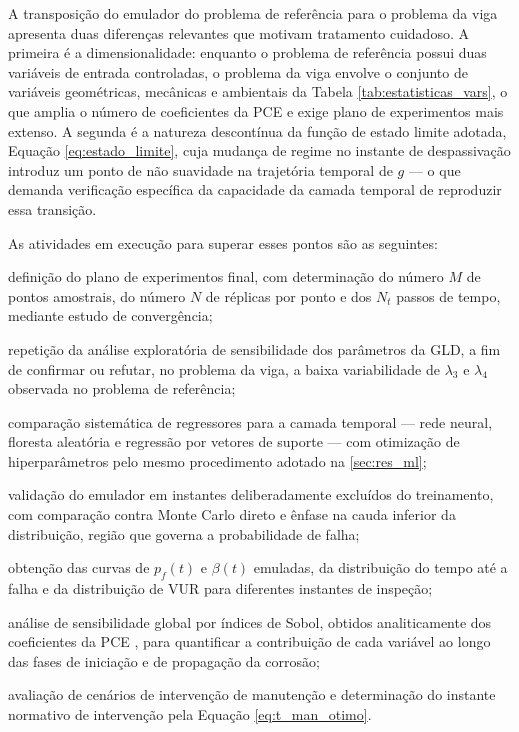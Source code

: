 A transposição do emulador do problema de referência para o problema da viga apresenta duas diferenças relevantes que motivam tratamento cuidadoso. A primeira é a dimensionalidade: enquanto o problema de referência possui duas variáveis de entrada controladas, o problema da viga envolve o conjunto de variáveis geométricas, mecânicas e ambientais da Tabela \ref{tab:estatisticas_vars}, o que amplia o número de coeficientes da PCE e exige plano de experimentos mais extenso. A segunda é a natureza descontínua da função de estado limite adotada, Equação \eqref{eq:estado_limite}, cuja mudança de regime no instante de despassivação introduz um ponto de não suavidade na trajetória temporal de $g$ --- o que demanda verificação específica da capacidade da camada temporal de reproduzir essa transição.

As atividades em execução para superar esses pontos são as seguintes:

\begin{alineas}
    \item definição do plano de experimentos final, com determinação do número $M$ de pontos amostrais, do número $N$ de réplicas por ponto e dos $N_t$ passos de tempo, mediante estudo de convergência;
    \item repetição da análise exploratória de sensibilidade dos parâmetros da GLD, a fim de confirmar ou refutar, no problema da viga, a baixa variabilidade de $\lambda_3$ e $\lambda_4$ observada no problema de referência;
    \item comparação sistemática de regressores para a camada temporal --- rede neural, floresta aleatória e regressão por vetores de suporte --- com otimização de hiperparâmetros pelo mesmo procedimento adotado na \autoref{sec:res_ml};
    \item validação do emulador em instantes deliberadamente excluídos do treinamento, com comparação contra Monte Carlo direto e ênfase na cauda inferior da distribuição, região que governa a probabilidade de falha;
    \item obtenção das curvas de $p_f(t)$ e $\beta(t)$ emuladas, da distribuição do tempo até a falha e da distribuição de VUR para diferentes instantes de inspeção;
    \item análise de sensibilidade global por índices de Sobol, obtidos analiticamente dos coeficientes da PCE \cite{sudret2008}, para quantificar a contribuição de cada variável ao longo das fases de iniciação e de propagação da corrosão;
    \item avaliação de cenários de intervenção de manutenção e determinação do instante normativo de intervenção pela Equação \eqref{eq:t_man_otimo}.
\end{alineas}

